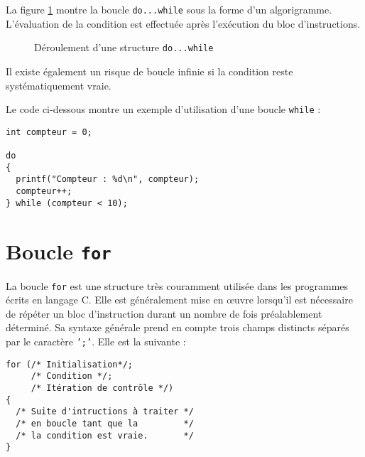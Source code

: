 \documentclass[DIV=calc,paper=a4,fontsize=11pt,twocolumn,halfparskip,parindent]{scrartcl} %
\begin{document}
La figure \ref{dowhile} montre la boucle \texttt{do...while} sous la forme d'un algorigramme. L'évaluation de la condition est effectuée après l'exécution du bloc
d'instructions.
\begin{figure}[!h]
\centering
{}
\caption{Déroulement d'une structure \texttt{do...while}}\label{dowhile}
\end{figure}

Il existe également un risque de boucle infinie si la condition reste systématiquement vraie. 

Le code ci-dessous montre un exemple d'utilisation d'une boucle \texttt{while} :
\begin{lstlisting}[frame=single]
int compteur = 0;
  
do
{
  printf("Compteur : %d\n", compteur);
  compteur++;
} while (compteur < 10);
\end{lstlisting}

\section*{Boucle \texttt{for}}
La boucle \texttt{for} est une structure très couramment utilisée dans les programmes écrits en langage C. Elle est généralement mise en \oe uvre lorsqu'il est nécessaire
de répéter un bloc d'instruction durant un nombre de fois préalablement déterminé. Sa syntaxe générale prend en compte trois champs distincts séparés par le caractère
\texttt{';'}. Elle est la suivante :\begin{lstlisting}[frame=single]
for (/* Initialisation*/;
     /* Condition */;
     /* Itération de contrôle */)
{
  /* Suite d'intructions à traiter */
  /* en boucle tant que la         */
  /* la condition est vraie.       */
}
\end{lstlisting}
\end{document}
